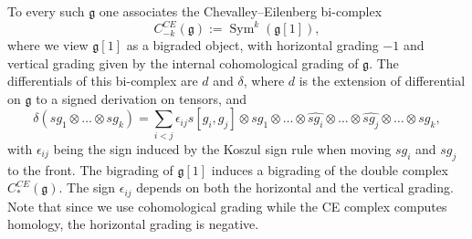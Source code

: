 \documentclass[12pt]{article}
\DeclareMathOperator{\Sym}{Sym}
\theoremstyle{plain}
\theoremstyle{definition}
\theoremstyle{remark}
\begin{document}
To every such $\mathfrak{g}$ one associates the Chevalley--Eilenberg bi-complex
\[
C^{CE}_{-k}(\mathfrak{g}) := \Sym^k(\mathfrak{g}[1]),
\]
where we view $\mathfrak{g}[1]$ as a bigraded object, with horizontal grading $-1$ and vertical grading given by the internal cohomological grading of $\mathfrak{g}$.
The differentials of this bi-complex are $d$ and $\delta$, where $d$ is the extension of differential on $\mathfrak{g}$ to a signed derivation on tensors, and
\[
    \delta(sg_1 \otimes \ldots \otimes sg_k) = \sum_{i<j}{\epsilon_{ij} s[g_i, g_j]\otimes sg_1 \otimes \ldots \otimes \widehat{sg_i}\otimes \ldots \otimes \widehat{sg_j} \otimes \ldots\otimes sg_k},
\]
with $\epsilon_{ij}$ being the sign induced by the Koszul sign rule when moving $sg_i$ and $sg_j$ to the front. %
The bigrading of $\mathfrak{g}[1]$ induces a bigrading of the double complex $C^{CE}_*(\mathfrak{g})$. The sign $\epsilon_{ij}$ depends on both the horizontal and the vertical grading. %
Note that since we use cohomological grading while the CE complex computes homology, the horizontal grading is negative.
\end{document}
